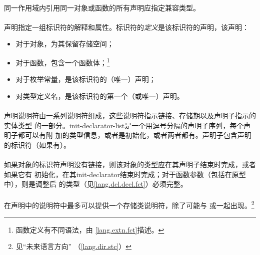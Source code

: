 \paragraph{}
同一作用域内引用同一对象或函数的所有声明应指定兼容类型。

\semantic
\paragraph{}
声明指定一组标识符的解释和属性。标识符的\textit{定义}是该标识符的声明，该声明：
\begin{itemize}
  \item{对于对象，为其保留存储空间；}
  \item{对于函数，包含一个函数体；\footnote{函数定义有不同语法，由
    \ref{lang.extn.fct}描述。}}
  \item{对于枚举常量，是该标识符的（唯一）声明；}
  \item{对类型定义名，是该标识符的第一个（或唯一）声明。}
\end{itemize}

\paragraph{}
声明说明符由一系列说明符组成，这些说明符指示链接、存储期以及声明子指示的实体类型
的一部分。init-declarator-list是一个用逗号分隔的声明子序列，每个声明子都可以有附
加的类型信息，或者是初始化，或者两者都有。声明子包含声明的标识符（如果有）。

\paragraph{}
如果对象的标识符声明没有链接，则该对象的类型应在其声明子结束时完成，或者如果它有
初始化，在其init-declarator结束时完成；对于函数参数（包括在原型中），则是调整后
的类型（见\ref{lang.dcl.decl.fct}）必须完整。


\syntax
\paragraph{}

\constraint
\paragraph{}
在声明中的说明符中最多可以提供一个存储类说明符，除了可能与
或一起出现。\footnote{见``未来语言方向''
（\ref{lang.dir.stc}）}

